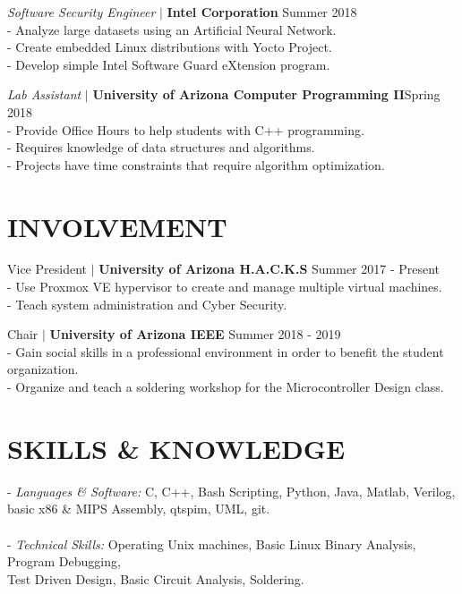 \documentclass[line, 12pt]{res}
\newcommand\tab[1][0.5cm]{\hspace*{#1}}
\begin{document}
\begin{resume}
				{\sl Software Security Engineer} $\mid$ \textbf{Intel Corporation} \hfill Summer 2018 \\
                 	\tab - Analyze large datasets using an Artificial Neural Network. \\
                 	\tab - Create embedded Linux distributions with Yocto Project. \\
                 	\tab - Develop simple Intel Software Guard eXtension program.
 		
 
                {\sl Lab Assistant} $\mid$ \textbf{University of Arizona Computer Programming II}\hfill Spring 2018 \\
                 	\tab - Provide Office Hours to help students with C++ programming. \\
                 	\tab - Requires knowledge of data structures and algorithms. \\
                 	\tab - Projects have time constraints that require algorithm optimization.
				
				
				

\section{INVOLVEMENT} 
	Vice President $\mid$ \textbf{University of Arizona H.A.C.K.S} \hfill Summer 2017 - Present \\
	\tab - Use Proxmox VE hypervisor to create and manage multiple virtual machines. \\
	\tab - Teach system administration and Cyber Security.

	Chair $\mid$ \textbf{University of Arizona IEEE} \hfill Summer 2018 - 2019 \\
		\tab - Gain social skills in a professional environment in order to benefit the student organization. \\
		\tab - Organize and teach a soldering workshop for the Microcontroller Design class.
	

\section{SKILLS \& KNOWLEDGE} 
	- {\sl Languages \& Software:} C, C++, Bash Scripting, Python, Java, Matlab, Verilog, \\ \tab[4.48cm] basic x86 \& MIPS Assembly, qtspim, UML, git. \\ \\
	- {\sl Technical Skills:} Operating Unix machines, Basic Linux Binary Analysis, Program Debugging, \\ \tab[3.25cm] Test Driven Design, Basic Circuit Analysis, Soldering.
 

\end{resume}
\end{document}
